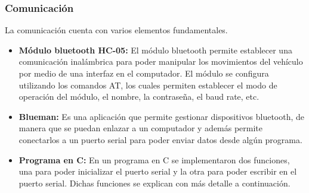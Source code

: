 \subsubsection{Comunicación}
La comunicación cuenta con varios elementos fundamentales.
\begin{itemize}
    \item\textbf{Módulo bluetooth HC-05:} El módulo bluetooth permite establecer una comunicación inalámbrica para poder manipular los movimientos del vehículo por medio de una interfaz en el computador. El módulo se configura utilizando los comandos AT, los cuales permiten establecer el modo de operación del módulo, el nombre, la contraseña, el baud rate, etc.
    \item\textbf{Blueman:} Es una aplicación que permite gestionar dispositivos bluetooth, de manera que se puedan enlazar a un computador y además permite conectarlos a un puerto serial para poder enviar datos desde algún programa.
    \item\textbf{Programa en C:} En un programa en C se implementaron dos funciones, una para poder inicializar el puerto serial y la otra para poder escribir en el puerto serial. Dichas funciones se explican con más detalle a continuación.
\end{itemize}                         

